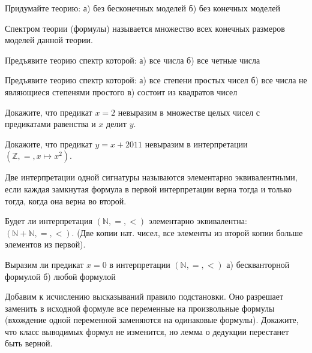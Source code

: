 \setcounter{curtask}{21}



\begin{task}
    Придумайте теорию:
    а) без бесконечных моделей
    б) без конечных моделей
\end{task}

Спектром теории (формулы) называется множество всех конечных размеров моделей данной
теории.

\begin{task}
    Предъявите теорию спектр которой:
    а) все числа
    б) все четные числа
\end{task}

\begin{task}
    Предъявите теорию спектр которой:
    а) все степени простых чисел
    б) все числа не являющиеся степенями простого
    в) состоит из квадратов чисел
\end{task}

\begin{task}
    Докажите, что предикат $x = 2$ невыразим в множестве целых чисел с
    предикатами равенства и $x$ делит $y$.
\end{task}

\begin{task}
    Докажите, что предикат $y = x + 2011$ невыразим в интерпретации
    $(\mathbb{Z}, =, x \mapsto x^2)$.
\end{task}

Две интерпретации одной сигнатуры называются элементарно
эквивалентными, если каждая замкнутая формула в первой интерпретации
верна тогда и только тогда, когда она верна во второй.

\begin{task}
    Будет ли интерпретация $(\mathbb{N}, =, <)$ элементарно
    эквивалентна: $(\mathbb{N} + \mathbb{N}, =, <)$. (Две копии нат. чисел, все
    элементы из второй копии больше элементов из первой).
\end{task}

\begin{task}
    Выразим ли предикат $x = 0$ в интерпретации $(\mathbb{N}, =, <)$
    а) бескванторной формулой
    б) любой формулой
\end{task}


\breakline

\begin{ptask}{20}
    Добавим к исчислению высказываний правило подстановки. Оно разрешает заменить в
    исходной формуле все переменные на произвольные формулы (вхождение одной
    переменной заменяются на одинаковые формулы). Докажите, что класс выводимых
    формул не изменится, но лемма о дедукции перестанет быть верной. 
\end{ptask}
